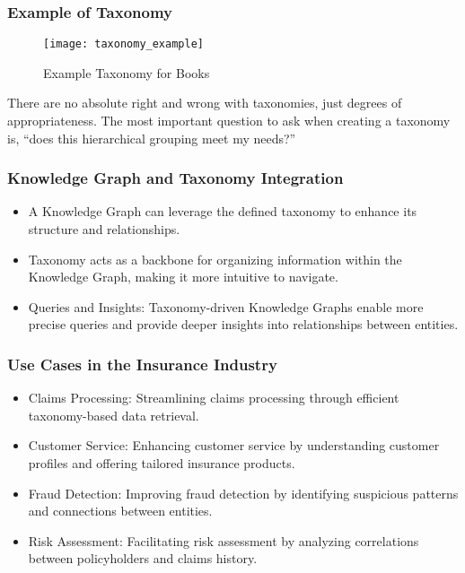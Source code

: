 \begin{frame}[fragile]
\frametitle{Example of Taxonomy}
\begin{figure}[h]
\centering
\texttt{[image: taxonomy\_example]}
\caption{Example Taxonomy for Books}
\end{figure}

There are no absolute right and wrong with taxonomies, just degrees of appropriateness. The most important question to ask when creating a taxonomy is, “does this hierarchical grouping meet my needs?”
\end{frame}

\begin{frame}[fragile]
\frametitle{Knowledge Graph and Taxonomy Integration}
\begin{itemize}
\item A Knowledge Graph can leverage the defined taxonomy to enhance its structure and relationships.
\item Taxonomy acts as a backbone for organizing information within the Knowledge Graph, making it more intuitive to navigate.
\item Queries and Insights: Taxonomy-driven Knowledge Graphs enable more precise queries and provide deeper insights into relationships between entities.
\end{itemize}
\end{frame}

\begin{frame}[fragile]
\frametitle{Use Cases in the Insurance Industry}
\begin{itemize}
\item Claims Processing: Streamlining claims processing through efficient taxonomy-based data retrieval.
\item Customer Service: Enhancing customer service by understanding customer profiles and offering tailored insurance products.
\item Fraud Detection: Improving fraud detection by identifying suspicious patterns and connections between entities.
\item Risk Assessment: Facilitating risk assessment by analyzing correlations between policyholders and claims history.
\end{itemize}
\end{frame}

